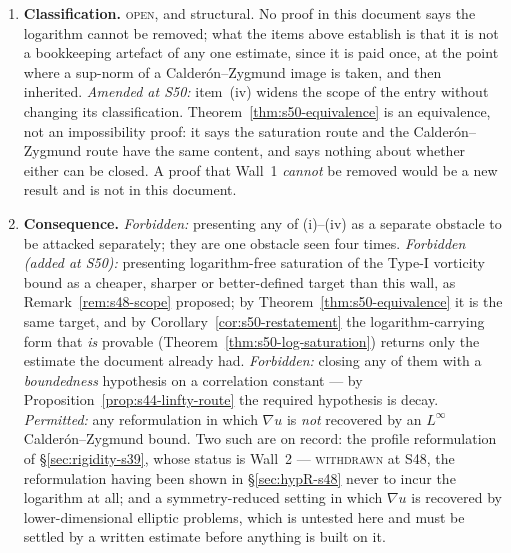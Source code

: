 \documentclass[11pt]{article}
\theoremstyle{definition}
\theoremstyle{remark}
\begin{document}
\begin{enumerate}[label=(\alph*),leftmargin=2.2em]
\begin{enumerate}[label=\textup{(\roman*)},leftmargin=2.6em]
        \emph{equivalent}, with reciprocal constants, to
        $\|\nabla u\|_{L^\infty}\leq KM$ --- the bound item~(a) above
        requires. It is a fourth face of this wall, not a route around it.
    \end{enumerate}
  \item \textbf{Classification.} \textsc{open}, and structural. No proof in
    this document says the logarithm cannot be removed; what the items
    above establish is that it is not a bookkeeping artefact of any one
    estimate, since it is paid once, at the point where a sup-norm of a
    Calder\'on--Zygmund image is taken, and then inherited.
    \emph{Amended at S50:} item~(iv) widens the scope of the entry without
    changing its classification. Theorem~\ref{thm:s50-equivalence} is an
    equivalence, not an impossibility proof: it says the saturation route and
    the Calder\'on--Zygmund route have the same content, and says nothing
    about whether either can be closed. A proof that Wall~1 \emph{cannot} be
    removed would be a new result and is not in this document.
  \item \textbf{Consequence.} \emph{Forbidden:} presenting any of (i)--(iv)
    as a separate obstacle to be attacked separately; they are one obstacle
    seen four times. \emph{Forbidden (added at S50):} presenting logarithm-free
    saturation of the Type-I vorticity bound as a cheaper, sharper or
    better-defined target than this wall, as Remark~\ref{rem:s48-scope}
    proposed; by Theorem~\ref{thm:s50-equivalence} it is the same target, and
    by Corollary~\ref{cor:s50-restatement} the logarithm-carrying form that
    \emph{is} provable (Theorem~\ref{thm:s50-log-saturation}) returns only
    the estimate the document already had. \emph{Forbidden:} closing any of them with a
    \emph{boundedness} hypothesis on a correlation constant --- by
    Proposition~\ref{prop:s44-linfty-route} the required hypothesis is decay.
    \emph{Permitted:} any reformulation in which $\nabla u$ is \emph{not}
    recovered by an $L^\infty$ Calder\'on--Zygmund bound. Two such are on
    record: the profile reformulation of \S\ref{sec:rigidity-s39}, whose
    status is Wall~2 --- \textsc{withdrawn} at S48, the reformulation having
    been shown in \S\ref{sec:hypR-s48} never to incur the logarithm at all;
    and a symmetry-reduced setting in which $\nabla u$ is
    recovered by lower-dimensional elliptic problems, which is untested here
    and must be settled by a written estimate before anything is built on it.
\end{enumerate}
\end{document}
